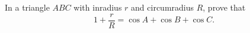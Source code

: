 In a triangle $ABC$ with inradius $r$ and circumradius $R$, prove that \[1+\frac{r}{R}=\cos A+\cos B+\cos C.\]